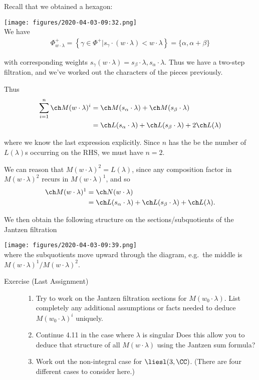Recall that we obtained a hexagon:

\texttt{[image: figures/2020-04-03-09:32.png]}\\

We have \begin{align*}
\Phi_{w\cdot \lambda}^{+}=\left\{\gamma \in \Phi^{+} | s_{\gamma} \cdot(w\cdot \lambda)<w \cdot \lambda\right\}=\{\alpha, \alpha+\beta\}
\end{align*}

with corresponding weights
\(s_\gamma(w\cdot \lambda) = s_\beta \cdot \lambda, s_\alpha \cdot \lambda\).
Thus we have a two-step filtration, and we've worked out the characters
of the pieces previously.

Thus \begin{align*}
\sum_{i=1}^n \ch M(w\cdot \lambda)^i 
&= \ch M(s_\alpha \cdot \lambda) + \ch M(s_\beta \cdot \lambda) \\
&= \ch L(s_\alpha \cdot \lambda) + \ch L(s_\beta \cdot \lambda) + 2\ch L(\lambda)
\end{align*}

where we know the last expression explicitly. Since \(n\) has the be the
number of \(L(\lambda)\)s occurring on the RHS, we must have \(n=2\).

We can reason that \(M(w\cdot \lambda)^2 = L(\lambda)\), since any
composition factor in \(M(w\cdot \lambda)^2\) recurs in
\(M(w\cdot \lambda)^1\), and so \begin{align*}
\ch M(w\cdot \lambda)^1 
&= \ch N(w\cdot \lambda) \\
&= \ch L(s_\alpha \cdot \lambda) + \ch L(s_\beta \cdot \lambda) + \ch L(\lambda)
.\end{align*}

We then obtain the following structure on the sections/subquotients of
the Jantzen filtration

\texttt{[image: figures/2020-04-03-09:39.png]}\\

where the subquotients move upward through the diagram, e.g.~the middle
is \(M(w\cdot \lambda)^1 / M(w\cdot \lambda)^2\).

\begin{description}
\item[Exercise (Last Assignment)]
\hfill

\begin{enumerate}
\def\labelenumi{\arabic{enumi}.}
\tightlist
\item
  Try to work on the Jantzen filtration sections for
  \(M(w_0 \cdot \lambda)\). List completely any additional assumptions
  or facts needed to deduce \(M(w_0 \cdot \lambda)^i\) uniquely.
\item
  Continue 4.11 in the case where \(\lambda\) is singular Does this
  allow you to deduce that structure of all \(M(w\cdot \lambda)\) using
  the Jantzen sum formula?
\item
  Work out the non-integral case for \(\liesl(3, \CC)\). (There are four
  different cases to consider here.)
\end{enumerate}
\end{description}

